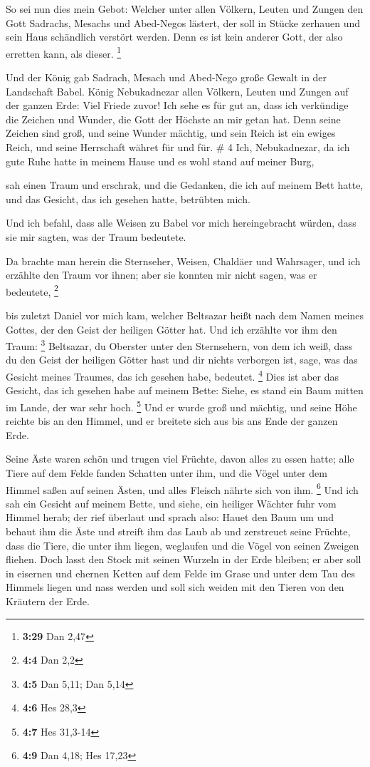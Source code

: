  So sei nun dies mein Gebot: Welcher unter allen Völkern,
Leuten und Zungen den Gott Sadrachs, Mesachs und Abed-Negos lästert, der
soll in Stücke zerhauen und sein Haus schändlich verstört werden. Denn
es ist kein anderer Gott, der also erretten kann, als dieser.
\footnote{\textbf{3:29} Dan 2,47}

 Und der König gab Sadrach, Mesach und Abed-Nego große
Gewalt in der Landschaft Babel.  König Nebukadnezar allen
Völkern, Leuten und Zungen auf der ganzen Erde: Viel Friede zuvor!
 Ich sehe es für gut an, dass ich verkündige die Zeichen
und Wunder, die Gott der Höchste an mir getan hat.  Denn
seine Zeichen sind groß, und seine Wunder mächtig, und sein Reich ist
ein ewiges Reich, und seine Herrschaft währet für und für. \# 4
 Ich, Nebukadnezar, da ich gute Ruhe hatte in meinem Hause
und es wohl stand auf meiner Burg,

 sah einen Traum und erschrak, und die Gedanken, die ich auf
meinem Bett hatte, und das Gesicht, das ich gesehen hatte, betrübten
mich.

 Und ich befahl, dass alle Weisen zu Babel vor mich
hereingebracht würden, dass sie mir sagten, was der Traum bedeutete.

 Da brachte man herein die Sternseher, Weisen, Chaldäer und
Wahrsager, und ich erzählte den Traum vor ihnen; aber sie konnten mir
nicht sagen, was er bedeutete, \footnote{\textbf{4:4} Dan 2,2}

 bis zuletzt Daniel vor mich kam, welcher Beltsazar heißt
nach dem Namen meines Gottes, der den Geist der heiligen Götter hat. Und
ich erzählte vor ihm den Traum: \footnote{\textbf{4:5} Dan 5,11; Dan
  5,14}  Beltsazar, du Oberster unter den Sternsehern, von
dem ich weiß, dass du den Geist der heiligen Götter hast und dir nichts
verborgen ist, sage, was das Gesicht meines Traumes, das ich gesehen
habe, bedeutet. \footnote{\textbf{4:6} Hes 28,3}  Dies ist
aber das Gesicht, das ich gesehen habe auf meinem Bette: Siehe, es stand
ein Baum mitten im Lande, der war sehr hoch. \footnote{\textbf{4:7} Hes
  31,3-14}  Und er wurde groß und mächtig, und seine Höhe
reichte bis an den Himmel, und er breitete sich aus bis ans Ende der
ganzen Erde.

 Seine Äste waren schön und trugen viel Früchte, davon alles
zu essen hatte; alle Tiere auf dem Felde fanden Schatten unter ihm, und
die Vögel unter dem Himmel saßen auf seinen Ästen, und alles Fleisch
nährte sich von ihm. \footnote{\textbf{4:9} Dan 4,18; Hes 17,23}
 Und ich sah ein Gesicht auf meinem Bette, und siehe, ein
heiliger Wächter fuhr vom Himmel herab;  der rief überlaut
und sprach also: Hauet den Baum um und behaut ihm die Äste und streift
ihm das Laub ab und zerstreuet seine Früchte, dass die Tiere, die unter
ihm liegen, weglaufen und die Vögel von seinen Zweigen fliehen.
 Doch lasst den Stock mit seinen Wurzeln in der Erde
bleiben; er aber soll in eisernen und ehernen Ketten auf dem Felde im
Grase und unter dem Tau des Himmels liegen und nass werden und soll sich
weiden mit den Tieren von den Kräutern der Erde.

